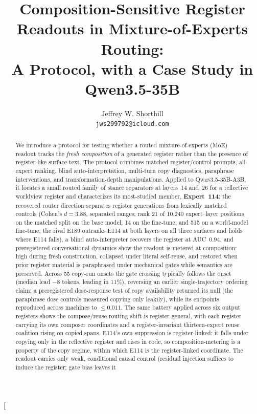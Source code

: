 \documentclass[10pt,a4paper,twocolumn]{article}
\title{\vspace{-1.0em}Composition-Sensitive Register Readouts in Mixture-of-Experts
Routing:\\A Protocol, with a Case Study in Qwen3.5-35B}
\author{Jeffrey W. Shorthill\\\texttt{jws299792@icloud.com}}
\date{}
\begin{document}
\twocolumn[
\begin{@twocolumnfalse}
\maketitle
\begin{abstract}
\noindent
We introduce a protocol for testing whether a routed mixture-of-experts (MoE)
readout tracks the \emph{fresh composition} of a generated register rather than
the presence of register-like surface text. The protocol combines matched
register/control prompts, all-expert ranking, blind auto-interpretation,
multi-turn copy diagnostics, paraphrase interventions, and transformation-depth
manipulations. Applied to \textsc{Qwen3.5-35B-A3B}, it locates a small routed
family of stance separators at layers~14 and~26 for a reflective worldview
register and characterizes its most-studied member, \textbf{Expert~114}: the
recovered router direction separates register generations from lexically
matched controls (Cohen's $d{=}3.88$, separated ranges; rank 21 of 10{,}240 expert--layer
positions on the matched split on the base model, 14 on the fine-tune, and 515
on a world-model fine-tune; the rival E189 outranks E114 at both layers on all
three surfaces and holds where E114 falls), a blind auto-interpreter
recovers the register at AUC~$0.94$, and preregistered conversational dynamics
show the readout is metered at composition: high during fresh construction,
collapsed under literal self-reuse, and restored when prior register material
is paraphrased under mechanical gates while semantics are preserved.
Across 55 copy-run onsets the gate crossing typically follows the onset (median
lead $-8$ tokens, leading in 11\%), reversing an earlier single-trajectory
ordering claim; a preregistered dose-response test of copy availability
returned its null (the paraphrase dose controls measured copying only leakily),
while its endpoints reproduced across machines to $\le 0.011$.
The same
battery applied across six output registers shows the compose/reuse routing
shift is register-general, with each register carrying its own composer
coordinates and a register-invariant thirteen-expert reuse coalition rising on
copied spans.
E114's own suppression is register-linked: it falls under copying only in the
reflective register and rises in code, so composition-metering is a property of
the copy regime, within which E114 is the register-linked coordinate.
The readout carries only weak, conditional causal control
(residual injection suffices to induce the register; gate bias leaves it

\end{abstract}
\end{@twocolumnfalse}
\end{document}
